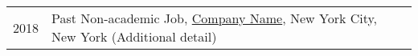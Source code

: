 
\begin{longtable}[l]{@{}p{} p{}}

    2018 & Past Non-academic Job, \href{https://example.com/}{Company Name}, New York City, New York (Additional detail) \\

\end{longtable}